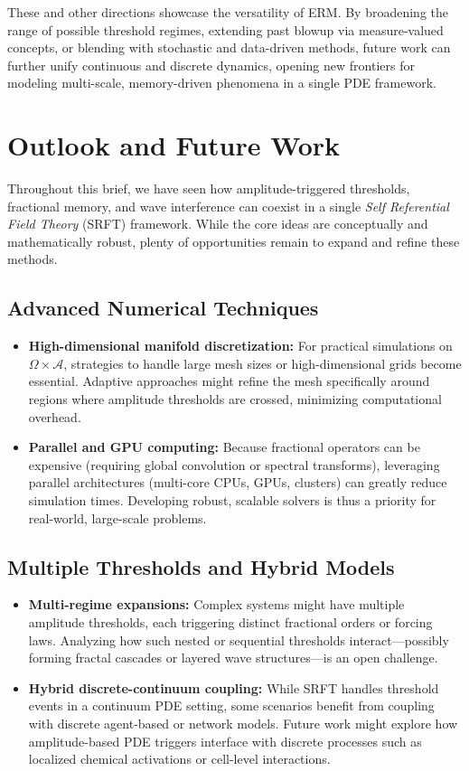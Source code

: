 \documentclass[12pt]{article}
\begin{document}
\noindent
These and other directions showcase the versatility of ERM. By broadening the
range of possible threshold regimes, extending past blowup via measure-valued
concepts, or blending with stochastic and data-driven methods, future work can
further unify continuous and discrete dynamics, opening new frontiers for
modeling multi-scale, memory-driven phenomena in a single PDE framework.

\section{Outlook and Future Work}
\label{sec:outlook_future}

Throughout this brief, we have seen how amplitude-triggered thresholds, fractional
memory, and wave interference can coexist in a single \emph{Self Referential Field Theory }
(SRFT) framework. While the core ideas are conceptually and mathematically robust,
plenty of opportunities remain to expand and refine these methods.

\subsection{Advanced Numerical Techniques}
\begin{itemize}
    \item \textbf{High-dimensional manifold discretization:}
    For practical simulations on $\Omega \times \mathcal{A}$, strategies to
    handle large mesh sizes or high-dimensional grids become essential.
    Adaptive approaches might refine the mesh specifically around regions
    where amplitude thresholds are crossed, minimizing computational overhead.
    \item \textbf{Parallel and GPU computing:}
    Because fractional operators can be expensive (requiring global convolution
    or spectral transforms), leveraging parallel architectures (multi-core CPUs,
    GPUs, clusters) can greatly reduce simulation times. Developing robust,
    scalable solvers is thus a priority for real-world, large-scale problems.
\end{itemize}

\subsection{Multiple Thresholds and Hybrid Models}
\begin{itemize}
    \item \textbf{Multi-regime expansions:}
    Complex systems might have multiple amplitude thresholds, each triggering
    distinct fractional orders or forcing laws. Analyzing how such nested or
    sequential thresholds interact—possibly forming fractal cascades or layered
    wave structures—is an open challenge.
    \item \textbf{Hybrid discrete-continuum coupling:}
    While SRFT handles threshold events in a continuum PDE setting, some scenarios
    benefit from coupling with discrete agent-based or network models. Future work
    might explore how amplitude-based PDE triggers interface with discrete
    processes such as localized chemical activations or cell-level interactions.
\end{itemize}
\end{document}

